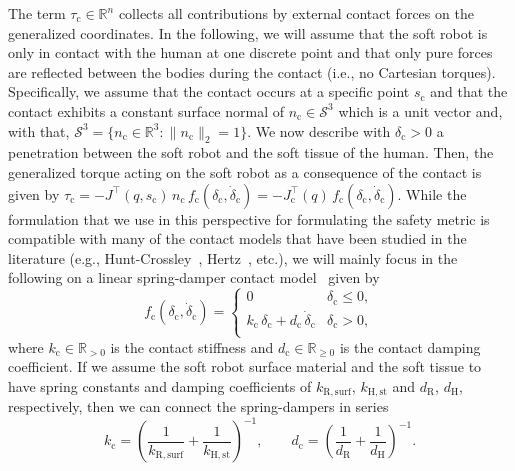 The term $\tau_\mathrm{c} \in \mathbb{R}^n$ collects all contributions by external contact forces on the generalized coordinates.
In the following, we will assume that the soft robot is only in contact with the human at one discrete point and that only pure forces are reflected between the bodies during the contact (i.e., no Cartesian torques).
Specifically, we assume that the contact occurs at a specific point $s_\mathrm{c}$ and that the contact exhibits a constant surface normal of $n_\mathrm{c} \in \mathcal{S}^3$ which is a unit vector and, with that, $\mathcal{S}^3 = \{ n_\mathrm{c} \in \mathbb{R}^3: \lVert n_\mathrm{c} \rVert_2 = 1 \}$.
We now describe with $\delta_\mathrm{c} > 0$ a penetration between the soft robot and the soft tissue of the human.
Then, the generalized torque acting on the soft robot as a consequence of the contact is given by $\tau_\mathrm{c} = -J^\top(q,s_\mathrm{c}) \, n_\mathrm{c} \, f_\mathrm{c}(\delta_\mathrm{c}, \dot{\delta}_\mathrm{c}) = -J_\mathrm{c}^\top(q) \, f_\mathrm{c}(\delta_\mathrm{c}, \dot{\delta}_\mathrm{c})$.
While the formulation that we use in this perspective for formulating the safety metric is compatible with many of the contact models that have been studied in the literature (e.g., Hunt-Crossley~\citep{hunt1975coefficient, aouaj2021predicting}, Hertz~\citep{johnson1987contact, park2011designing, she2020comparative}, etc.), we will mainly focus in the following on a linear spring-damper contact model~\citep{Isots_15066_2016, haddadin2009requirements} given by
\begin{equation}
    f_\mathrm{c}(\delta_\mathrm{c}, \dot{\delta}_\mathrm{c}) = \begin{cases}
        0 & \delta_\mathrm{c} \leq 0,\\
        k_\mathrm{c} \, \delta_\mathrm{c} + d_\mathrm{c} \, \dot{\delta}_\mathrm{c} & \delta_\mathrm{c} > 0,\\
\end{cases}
\end{equation}
where $k_\mathrm{c} \in \mathbb{R}_{>0}$ is the contact stiffness and $d_\mathrm{c} \in \mathbb{R}_{\geq 0}$ is the contact damping coefficient.
If we assume the soft robot surface material and the soft tissue to have spring constants and damping coefficients of $k_\mathrm{R,surf}$, $k_\mathrm{H,st}$ and $d_\mathrm{R}$, $d_\mathrm{H}$, respectively, then we can connect the spring-dampers in series
\begin{equation}
    k_\mathrm{c} = \left (\frac{1}{k_\mathrm{R,surf}} + \frac{1}{k_\mathrm{H,st}} \right )^{-1},
    \qquad
    d_\mathrm{c} = \left (\frac{1}{d_\mathrm{R}} + \frac{1}{d_\mathrm{H}} \right )^{-1}.
\end{equation}

